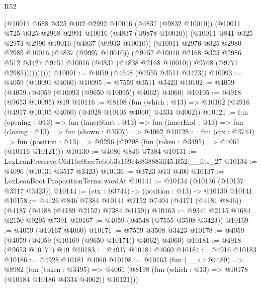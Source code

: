 \begin{lexlean}{R52}
\begin{coremodule}
            (@10011
              @688
              @325
              @402
              @2992
              @10016
              (@4837 (@9832 @10010))
              (@10011
                @725
                @325
                @2968
                @2991
                @10016
                (@4837 (@9878 @10010))
                (@10011
                  @841
                  @325
                  @2973
                  @2990
                  @10016
                  (@4837 (@9933 @10010))
                  (@10011
                    @2976
                    @325
                    @2980
                    @2989
                    @10016
                    (@4837 (@9997 @10010))
                    (@9752
                      @10010
                      @2168
                      @325
                      @2986
                      @512
                      @3427
                      @9751
                      @10016
                      (@4837 (@4838 @2168 @10010))
                      @9768
                      (@9771 @2985))))))))))
@10091 := @4059 (@4548 (@7555 @3511 @3423))
@10093 := @4059 (@10091 @4060)
@10095 := @7559 @3511 @3423
@10102 := @4059 (@4059 (@4059 (@10093 (@9650 @10095)) @4062) @4060)
@10105 := @4918 (@9653 @10095) @19
@10116 := @8198
    (fun (which : @13) => @10102 (@4916 (@4917 @10105 @4060) (@4928 @10105 @4060) @4334 @4062))
@10121 := fun (opening : @13) =>
  fun (innerStart : @13) =>
  fun (innerEnd : @13) => fun (closing : @13) => fun (shown : @3507) => @4062
@10128 := fun (ctx : @3744) =>
  fun (position : @13) => @9296 (@9298 (fun (token : @3495) => @4061 (@10116 @10121)))
@10130 := @4080 @846 @7384
@10131 := LexLeanPreserve.C6d1bc0bcc7cbbb3a169c4e838883ff45.R52.__fits_27
@10134 := @4096 (@10131 @3517 @3423)
@10136 := @3723 @13 @400
@10137 := LexLeanBoot.PropositionTerms.wordAt
@10141 := @10134 (@10136 (@10137 @3517 @3423))
@10144 := (ctx : @3744) -> (position : @13) -> @10130 @10141
@10158 := @4126
    @846
    @7384
    @10141
    @2152
    @7404
    (@4171 (@4181 @846))
    (@4187 (@4188 (@4189 @2152) @7384 @4159))
@10163 := @9341 @2115 @1684 @2150 @9295 @7391
@10167 := @4059 (@4548 (@7555 @3508 @3423))
@10169 := @4059 (@10167 @4060)
@10171 := @7559 @3508 @3423
@10178 := @4059 (@4059 (@4059 (@10169 (@9650 @10171)) @4062) @4060)
@10181 := @4918 (@9653 @10171) @19
@10183 := @4917 @10181 @4060
@10184 := @4916 @10183
@10186 := @4928 @10181 @4060
@10198 := @10163
    (fun (__a : @7489) =>
    @8982
      (fun (token : @3495) =>
      @4061 (@8198 (fun (which : @13) => @10178 (@10184 @10186 @4334 @4062)) @10121)))

\end{coremodule}
\end{lexlean}
